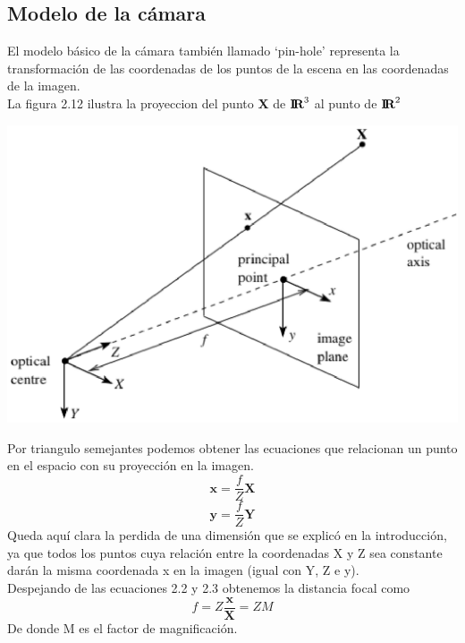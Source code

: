 \subsection{Modelo de la cámara}
El modelo básico de la cámara también llamado
‘pin-hole’ representa la transformación de las
coordenadas de los puntos de la escena en las
coordenadas de la imagen. \cite{Paper::Ricolfe2008}\\
La figura 2.12 ilustra la proyeccion del punto \textbf{X} de ${\textbf{I\!R}^3}$ al punto 
de ${\textbf{I\!R}^2}$
\begin{center}
	\includegraphics[width=1.0 \textwidth]{Contenido/Cuerpo/Capitulo2/Fig19.eps}
	\label{fig:MarcoTeorico:Fig11}
\end{center}
Por triangulo semejantes podemos obtener las ecuaciones que relacionan un punto en el espacio con
su proyección en la imagen.
\begin{equation}
	\textbf{x} = \frac{f}{Z}\textbf{X}
\end{equation}
\begin{equation}
	\textbf{y} = \frac{f}{Z}\textbf{Y}
\end{equation}
Queda aquí clara la perdida de una dimensión que se explicó en la introducción,
ya que todos los puntos cuya relación entre la coordenadas X y Z sea constante darán la
misma coordenada x en la imagen (igual con Y, Z e y).\cite{Book:Jose2005}\\
Despejando de las ecuaciones 2.2 y 2.3 obtenemos la distancia focal como
\begin{equation}
	f = Z \frac{\textbf{x}}{\textbf{X}}=ZM
\end{equation}
De donde M es el factor de magnificación.\\
